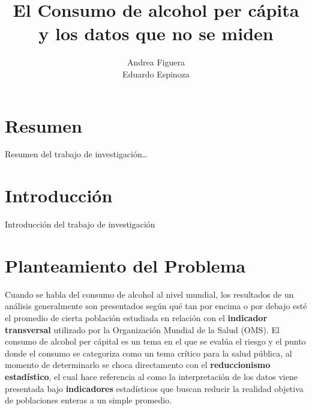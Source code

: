 \documentclass[oneside,11pt]{Latex/Classes/PhDthesisPSnPDF}
\title{El Consumo de alcohol per cápita y los datos que no se miden}
\author{Andrea Figuera \\ Eduardo Espinoza}
\begin{document}
\maketitle

\frontmatter


\setcounter{secnumdepth}{3}
\setcounter{tocdepth}{3}

\tableofcontents



\cleardoublepage

  \cleardoublepage       %
  \chapter*{Resumen}     %
  
  Resumen del trabajo de
investigación\ldots{}             %
  
  \cleardoublepage

\mainmatter
\def\baselinestretch{1.5}

\chapter*{Introducción}

Introducción del trabajo de investigación

\chapter{Planteamiento del Problema}

Cuando se habla del consumo de alcohol al nivel mundial, los resultados
de un análisis generalmente son presentados según qué tan por encima o
por debajo esté el promedio de cierta población estudiada en relación
con el \textbf{indicador transversal} utilizado por la Organización
Mundial de la Salud (OMS). El consumo de alcohol per cápital es un tema
en el que se evalúa el riesgo y el punto donde el consumo se categoriza
como un tema crítico para la salud pública, al momento de determinarlo
se choca directamento con el \textbf{reduccionismo estadístico}, el cual
hace referencia al como la interpretación de los datos viene presentada
bajo \textbf{indicadores} estadísticos que buscan reducir la realidad
objetiva de poblaciones enteras a un simple promedio.
\end{document}
